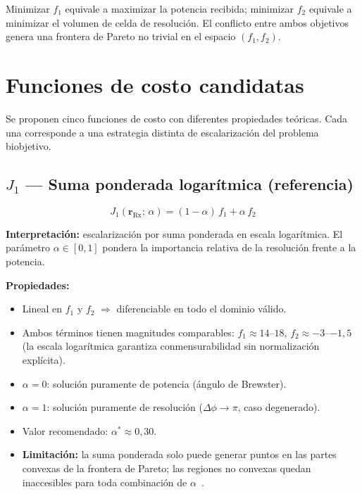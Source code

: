 \documentclass[11pt, a4paper]{article}
\newcommand{\Rx}{\mathrm{Rx}}
\newcommand{\rRx}{\mathbf{r}_{\Rx}}
\begin{document}
Minimizar $f_1$ equivale a maximizar la potencia recibida; minimizar $f_2$ equivale
a minimizar el volumen de celda de resolución. El conflicto entre ambos objetivos
genera una frontera de Pareto no trivial en el espacio $(f_1, f_2)$.

\section{Funciones de costo candidatas}

Se proponen cinco funciones de costo con diferentes propiedades teóricas. Cada una
corresponde a una estrategia distinta de escalarización del problema biobjetivo.

\subsection{\texorpdfstring{$J_1$}{J1} — Suma ponderada logarítmica (referencia)}

\begin{equation}
  \boxed{J_1(\rRx;\,\alpha) = (1-\alpha)\,f_1 + \alpha\,f_2}
  \label{eq:J1}
\end{equation}

\textbf{Interpretación:} escalarización por suma ponderada en escala logarítmica.
El parámetro $\alpha \in [0,1]$ pondera la importancia relativa de la resolución
frente a la potencia.

\textbf{Propiedades:}
\begin{itemize}
  \item Lineal en $f_1$ y $f_2$ $\Rightarrow$ diferenciable en todo el dominio válido.
  \item Ambos términos tienen magnitudes comparables: $f_1 \approx 14$–$18$,
    $f_2 \approx -3$–$-1{,}5$ (la escala logarítmica garantiza conmensurabilidad
    sin normalización explícita).
  \item $\alpha = 0$: solución puramente de potencia (ángulo de Brewster).
  \item $\alpha = 1$: solución puramente de resolución ($\Delta\phi \to \pi$,
    caso degenerado).
  \item Valor recomendado: $\alpha^* \approx 0{,}30$.
  \item \textbf{Limitación:} la suma ponderada solo puede generar puntos en las partes
    convexas de la frontera de Pareto; las regiones no convexas quedan inaccesibles
    para toda combinación de $\alpha$~\cite{miettinen1998}.
\end{itemize}
\end{document}
